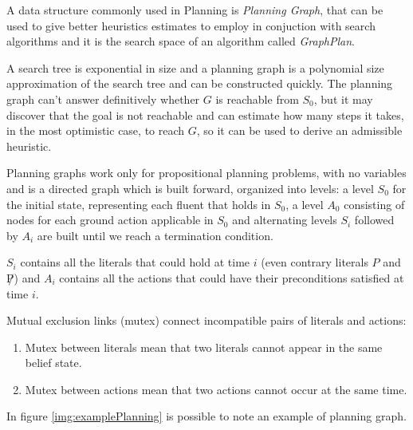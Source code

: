 A data structure commonly used in Planning is \emph{Planning Graph}, that can be used to give 
better heuristics estimates to employ in conjuction with search algorithms and it is the 
search space of an algorithm called \emph{GraphPlan}.

A search tree is exponential in size and a planning graph is a polynomial size approximation of 
the search tree and can be constructed quickly.\newline
The planning graph can't answer definitively whether $G$ is reachable from $S_0$, but it may 
discover that the goal is not reachable and can estimate how many steps it takes, in the most 
optimistic case, to reach $G$, so it can be used to derive an admissible heuristic.

Planning graphs work only for propositional planning problems, with no variables and is 
a directed graph which is built forward, organized into levels:
a level $S_0$ for the initial state, representing each fluent that holds in $S_0$, a level $A_0$ 
consisting of nodes for each ground action applicable in $S_0$ and alternating levels $S_i$
followed by $A_i$ are built until we reach a termination condition.

$S_i$ contains all the literals that could hold at time $i$ (even contrary literals $P$ and 
$\not P$) and $A_i$ contains all the actions that could have their preconditions satisfied 
at time $i$.

Mutual exclusion links (mutex) connect incompatible pairs of literals and actions:
\begin{enumerate}
	\item Mutex between literals mean that two literals cannot appear in the same belief state.
	\item Mutex between actions mean that two actions cannot occur at the same time.
\end{enumerate}
In figure \ref{img:examplePlanning} is possible to note an example of planning graph.

